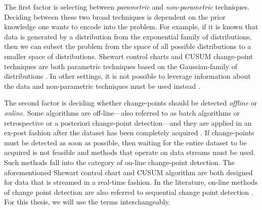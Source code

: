 The first factor is selecting between \textit{parametric} and \textit{non-parametric} techniques. Deciding between these two broad techniques is dependent on the prior knowledge one wants to encode into the problem. For example, if it is known that data is generated by a distribution from the exponential family of distributions, then we can subset the problem from the space of all possible distributions to a smaller space of distributions. Shewart control charts and CUSUM change-point techniques are both parametric techniques based on the Gaussian-family of distributions \cite{page1954continuous} \cite{chen2011parametric}. In other settings, it is not possible to leverage information about the data and non-parametric techniques must be used instead \cite{brodsky2013nonparametric}.


The second factor is deciding whether change-points should be detected \textit{offline} or \textit{online}. Some algorithms are off-line---also referred to  as batch algorithms or retrospective or a posteriori change-point detection---and they are applied in an ex-post fashion after the dataset has been completely acquired \cite{truong2018review}. If change-points must be detected as soon as possible, then waiting for the entire dataset to be acquired is not feasible and methods that operate on data streams must be used. Such methods fall into the category of on-line change-point detection. The aforementioned Shewart control chart and CUSUM algorithm are both designed for data that is streamed in a real-time fashion. In the literature, on-line methods of change point detection are also referred to sequential change point detection  \cite{tartakovsky2014sequential}. For this thesis, we will use the terms interchangeably.%


